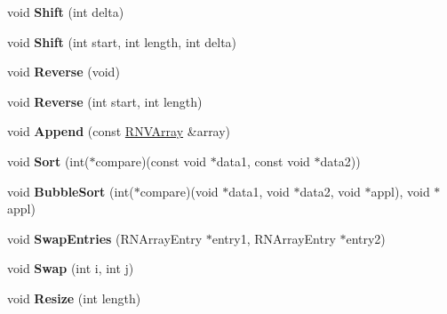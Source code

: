 \begin{DoxyCompactItemize}
\item 
void {\bfseries Shift} (int delta)\hypertarget{class_r_n_v_array_a6946227e5d151532a0f5139e2cb07a70}{}\label{class_r_n_v_array_a6946227e5d151532a0f5139e2cb07a70}

\item 
void {\bfseries Shift} (int start, int length, int delta)\hypertarget{class_r_n_v_array_a394a0e9aa938b7ba525801eadc8adf89}{}\label{class_r_n_v_array_a394a0e9aa938b7ba525801eadc8adf89}

\item 
void {\bfseries Reverse} (void)\hypertarget{class_r_n_v_array_a856220b4f2a2a4e3e2e2a9a77f4bf9ab}{}\label{class_r_n_v_array_a856220b4f2a2a4e3e2e2a9a77f4bf9ab}

\item 
void {\bfseries Reverse} (int start, int length)\hypertarget{class_r_n_v_array_ab377ff39212381c6c3363464b684611d}{}\label{class_r_n_v_array_ab377ff39212381c6c3363464b684611d}

\item 
void {\bfseries Append} (const \hyperlink{class_r_n_v_array}{R\+N\+V\+Array} \&array)\hypertarget{class_r_n_v_array_a1099acd09f8d9149c24760006ad7fd42}{}\label{class_r_n_v_array_a1099acd09f8d9149c24760006ad7fd42}

\item 
void {\bfseries Sort} (int($\ast$compare)(const void $\ast$data1, const void $\ast$data2))\hypertarget{class_r_n_v_array_ac179a02d90f7abb2b1cec55fa8a9e84b}{}\label{class_r_n_v_array_ac179a02d90f7abb2b1cec55fa8a9e84b}

\item 
void {\bfseries Bubble\+Sort} (int($\ast$compare)(void $\ast$data1, void $\ast$data2, void $\ast$appl), void $\ast$appl)\hypertarget{class_r_n_v_array_a58a27d63013d43a075cc32a431095146}{}\label{class_r_n_v_array_a58a27d63013d43a075cc32a431095146}

\item 
void {\bfseries Swap\+Entries} (R\+N\+Array\+Entry $\ast$entry1, R\+N\+Array\+Entry $\ast$entry2)\hypertarget{class_r_n_v_array_aa4056567c04670dcbe130975c7bd780f}{}\label{class_r_n_v_array_aa4056567c04670dcbe130975c7bd780f}

\item 
void {\bfseries Swap} (int i, int j)\hypertarget{class_r_n_v_array_a34a7a299dfe8bb525a594c9e99d08322}{}\label{class_r_n_v_array_a34a7a299dfe8bb525a594c9e99d08322}

\item 
void {\bfseries Resize} (int length)\hypertarget{class_r_n_v_array_a6e6d6cddd5781dd372166002676d6e68}{}\label{class_r_n_v_array_a6e6d6cddd5781dd372166002676d6e68}


\end{DoxyCompactItemize}
